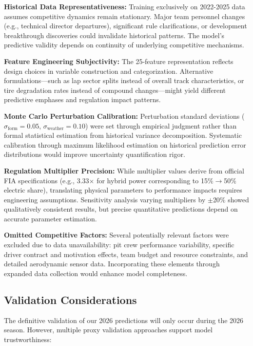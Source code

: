 \documentclass[conference]{IEEEtran}
\begin{document}
\textbf{Historical Data Representativeness:} Training exclusively on 2022-2025 data assumes competitive dynamics remain stationary. Major team personnel changes (e.g., technical director departures), significant rule clarifications, or development breakthrough discoveries could invalidate historical patterns. The model's predictive validity depends on continuity of underlying competitive mechanisms.

\textbf{Feature Engineering Subjectivity:} The 25-feature representation reflects design choices in variable construction and categorization. Alternative formulations—such as lap sector splits instead of overall track characteristics, or tire degradation rates instead of compound changes—might yield different predictive emphases and regulation impact patterns.

\textbf{Monte Carlo Perturbation Calibration:} Perturbation standard deviations ($\sigma_{\text{form}} = 0.05$, $\sigma_{\text{weather}} = 0.10$) were set through empirical judgment rather than formal statistical estimation from historical variance decomposition. Systematic calibration through maximum likelihood estimation on historical prediction error distributions would improve uncertainty quantification rigor.

\textbf{Regulation Multiplier Precision:} While multiplier values derive from official FIA specifications (e.g., 3.33$\times$ for hybrid power corresponding to 15\%$\to$50\% electric share), translating physical parameters to performance impacts requires engineering assumptions. Sensitivity analysis varying multipliers by $\pm$20\% showed qualitatively consistent results, but precise quantitative predictions depend on accurate parameter estimation.

\textbf{Omitted Competitive Factors:} Several potentially relevant factors were excluded due to data unavailability: pit crew performance variability, specific driver contract and motivation effects, team budget and resource constraints, and detailed aerodynamic sensor data. Incorporating these elements through expanded data collection would enhance model completeness.

\subsection{Validation Considerations}

The definitive validation of our 2026 predictions will only occur during the 2026 season. However, multiple proxy validation approaches support model trustworthiness:
\end{document}
